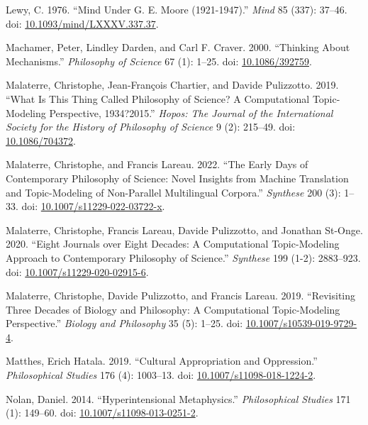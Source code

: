 \documentclass[
  11pt,
  letterpaper,
  DIV=11,
  numbers=noendperiod,
  twoside]{scrartcl}
\newlength{\cslhangindent}
\newenvironment{CSLReferences}[2] %
 {\begin{list}{}{%
  \setlength{\itemindent}{0pt}
  \setlength{\leftmargin}{0pt}
  \setlength{\parsep}{0pt}
  \ifodd #1
   \setlength{\leftmargin}{\cslhangindent}
   \setlength{\itemindent}{-1\cslhangindent}
  \fi
  \setlength{\itemsep}{#2\baselineskip}}}
 {\end{list}}
\begin{document}
\begin{CSLReferences}{1}{0}
Lewy, C. 1976. {``Mind Under {G. E. Moore} (1921-1947).''} \emph{Mind}
85 (337): 37--46. doi:
\href{https://doi.org/10.1093/mind/LXXXV.337.37}{10.1093/mind/LXXXV.337.37}.

Machamer, Peter, Lindley Darden, and Carl F. Craver. 2000. {``Thinking
About Mechanisms.''} \emph{Philosophy of Science} 67 (1): 1--25. doi:
\href{https://doi.org/10.1086/392759}{10.1086/392759}.

Malaterre, Christophe, Jean-François Chartier, and Davide Pulizzotto.
2019. {``What Is This Thing Called Philosophy of Science? A
Computational Topic-Modeling Perspective, 1934?2015.''} \emph{Hopos: The
Journal of the International Society for the History of Philosophy of
Science} 9 (2): 215--49. doi:
\href{https://doi.org/10.1086/704372}{10.1086/704372}.

Malaterre, Christophe, and Francis Lareau. 2022. {``The Early Days of
Contemporary Philosophy of Science: Novel Insights from Machine
Translation and Topic-Modeling of Non-Parallel Multilingual Corpora.''}
\emph{Synthese} 200 (3): 1--33. doi:
\href{https://doi.org/10.1007/s11229-022-03722-x}{10.1007/s11229-022-03722-x}.

Malaterre, Christophe, Francis Lareau, Davide Pulizzotto, and Jonathan
St-Onge. 2020. {``Eight Journals over Eight Decades: A Computational
Topic-Modeling Approach to Contemporary Philosophy of Science.''}
\emph{Synthese} 199 (1-2): 2883--923. doi:
\href{https://doi.org/10.1007/s11229-020-02915-6}{10.1007/s11229-020-02915-6}.

Malaterre, Christophe, Davide Pulizzotto, and Francis Lareau. 2019.
{``Revisiting Three Decades of Biology and Philosophy: A Computational
Topic-Modeling Perspective.''} \emph{Biology and Philosophy} 35 (5):
1--25. doi:
\href{https://doi.org/10.1007/s10539-019-9729-4}{10.1007/s10539-019-9729-4}.

Matthes, Erich Hatala. 2019. {``Cultural Appropriation and
Oppression.''} \emph{Philosophical Studies} 176 (4): 1003--13. doi:
\href{https://doi.org/10.1007/s11098-018-1224-2}{10.1007/s11098-018-1224-2}.

Nolan, Daniel. 2014. {``Hyperintensional Metaphysics.''}
\emph{Philosophical Studies} 171 (1): 149--60. doi:
\href{https://doi.org/10.1007/s11098-013-0251-2}{10.1007/s11098-013-0251-2}.


\end{CSLReferences}
\end{document}
